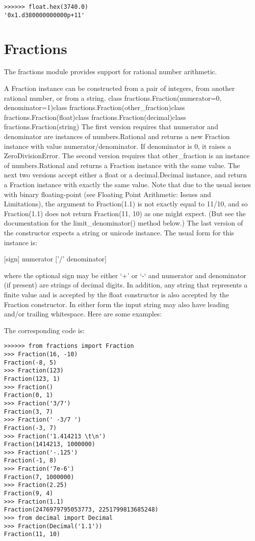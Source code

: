 \begin{lstlisting}
>>>>>> float.hex(3740.0)
'0x1.d380000000000p+11'
\end{lstlisting}



\section{Fractions}
The fractions module provides support for rational number arithmetic.

A Fraction instance can be constructed from a pair of integers, from another rational number, or from a string.
class fractions.Fraction(numerator=0, denominator=1)class fractions.Fraction(other\_fraction)class fractions.Fraction(float)class fractions.Fraction(decimal)class fractions.Fraction(string)
The first version requires that numerator and denominator are instances of numbers.Rational and returns a new Fraction instance with value numerator/denominator. If denominator is 0, it raises a ZeroDivisionError. The second version requires that other\_fraction is an instance of numbers.Rational and returns a Fraction instance with the same value. The next two versions accept either a float or a decimal.Decimal instance, and return a Fraction instance with exactly the same value. Note that due to the usual issues with binary floating-point (see Floating Point Arithmetic: Issues and Limitations), the argument to Fraction(1.1) is not exactly equal to 11/10, and so Fraction(1.1) does not return Fraction(11, 10) as one might expect. (But see the documentation for the limit\_denominator() method below.) The last version of the constructor expects a string or unicode instance. The usual form for this instance is:


[sign] numerator ['/' denominator]


where the optional sign may be either ‘+’ or ‘-‘ and numerator and denominator (if present) are strings of decimal digits. In addition, any string that represents a finite value and is accepted by the float constructor is also accepted by the Fraction constructor. In either form the input string may also have leading and/or trailing whitespace. Here are some examples:


The corresponding code is:

\begin{lstlisting}
>>>>>> from fractions import Fraction
>>> Fraction(16, -10)
Fraction(-8, 5)
>>> Fraction(123)
Fraction(123, 1)
>>> Fraction()
Fraction(0, 1)
>>> Fraction('3/7')
Fraction(3, 7)
>>> Fraction(' -3/7 ')
Fraction(-3, 7)
>>> Fraction('1.414213 \t\n')
Fraction(1414213, 1000000)
>>> Fraction('-.125')
Fraction(-1, 8)
>>> Fraction('7e-6')
Fraction(7, 1000000)
>>> Fraction(2.25)
Fraction(9, 4)
>>> Fraction(1.1)
Fraction(2476979795053773, 2251799813685248)
>>> from decimal import Decimal
>>> Fraction(Decimal('1.1'))
Fraction(11, 10)
\end{lstlisting}

